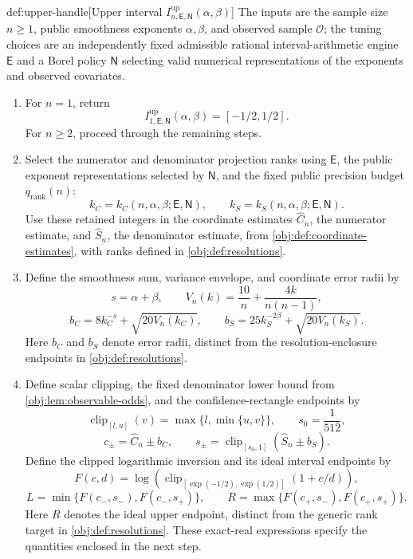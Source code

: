 \documentclass[11pt]{article}
\begin{document}
\begin{algorithmv}{def:upper-handle}[Upper interval $I^{\mathrm{up}}_{n,\mathsf E,\mathsf N}(\alpha,\beta)$]
The inputs are the sample size \(n\ge1\), public smoothness exponents \(\alpha,\beta\), and observed sample \(\mathcal O\); the tuning choices are an independently fixed admissible rational interval-arithmetic engine \(\mathsf E\) and a Borel policy \(\mathsf N\) selecting valid numerical representations of the exponents and observed covariates.
\begin{enumerate}
\item For \(n=1\), return
\[
I^{\mathrm{up}}_{1,\mathsf E,\mathsf N}(\alpha,\beta)
=[-1/2,1/2].
\]
For \(n\ge2\), proceed through the remaining steps.

\item Select the numerator and denominator projection ranks using \(\mathsf E\), the public exponent representations selected by \(\mathsf N\), and the fixed public precision budget \(q_{\mathrm{rank}}(n)\):
\[
k_C=k_C(n,\alpha,\beta;\mathsf E,\mathsf N),
\qquad
k_S=k_S(n,\alpha,\beta;\mathsf E,\mathsf N).
\]
Use these retained integers in the coordinate estimates \(\widehat C_n\), the numerator estimate, and \(\widehat S_n\), the denominator estimate, from \cref{obj:def:coordinate-estimates}, with ranks defined in \cref{obj:def:resolutions}.

\item Define the smoothness sum, variance envelope, and coordinate error radii by
\[
s=\alpha+\beta,\qquad
V_n(k)=\frac{10}{n}+\frac{4k}{n(n-1)},
\]
\[
b_C=8k_C^{-s}+\sqrt{20V_n(k_C)},
\qquad
b_S=25k_S^{-2\beta}+\sqrt{20V_n(k_S)}.
\]
Here \(b_C\) and \(b_S\) denote error radii, distinct from the resolution-enclosure endpoints in \cref{obj:def:resolutions}.

\item Define scalar clipping, the fixed denominator lower bound from \cref{obj:lem:observable-odds}, and the confidence-rectangle endpoints by
\[
\operatorname{clip}_{[l,u]}(v)=\max\{l,\min\{u,v\}\},
\qquad s_0=\frac{1}{512},
\]
\[
c_\pm=\widehat C_n\pm b_C,
\qquad
s_\pm=\operatorname{clip}_{[s_0,1]}(\widehat S_n\pm b_S).
\]
Define the clipped logarithmic inversion and its ideal interval endpoints by
\[
F(c,d)=
\log\!\left(
\operatorname{clip}_{[\exp(-1/2),\exp(1/2)]}(1+c/d)
\right),
\]
\[
L=\min\{F(c_-,s_-),F(c_-,s_+)\},
\qquad
R=\max\{F(c_+,s_-),F(c_+,s_+)\}.
\]
Here \(R\) denotes the ideal upper endpoint, distinct from the generic rank target in \cref{obj:def:resolutions}. These exact-real expressions specify the quantities enclosed in the next step.


\end{enumerate}
\end{algorithmv}
\end{document}
